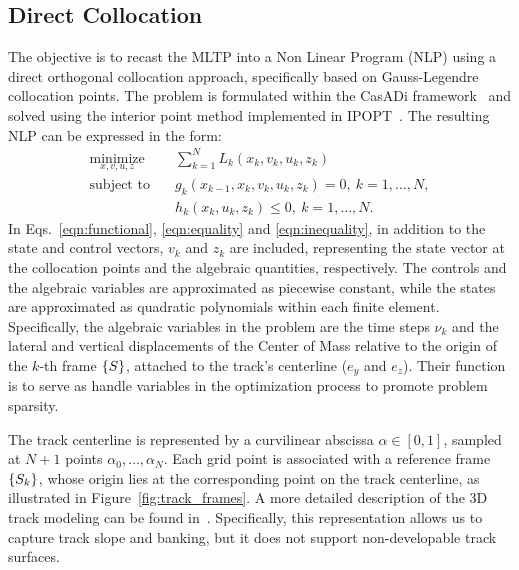 \subsection{Direct Collocation}
The objective is to recast the MLTP into a Non Linear Program (NLP) using a direct orthogonal collocation approach, specifically based on Gauss-Legendre collocation points. The problem is formulated within the CasADi framework~\cite{Andersson:MPC:2019} and solved using the interior point method implemented in IPOPT~\cite{Wachter:MP:2006}. The resulting NLP can be expressed in the form:
\begin{align}
	\underset{x,v,u,z}{\textrm{minimize}}&\quad\sum_{k=1}^NL_k(x_k,v_k,u_k,z_k)\label{eqn:functional}\\
	\textrm{subject to}&\quad g_k(x_{k-1},x_k,v_k,u_k,z_k)=0,\ k=1,\ldots,N,\label{eqn:equality}\\
	&\quad h_k(x_k,u_k,z_k)\le0,\ k=1,\ldots,N.\label{eqn:inequality}
\end{align}
In Eqs.~\eqref{eqn:functional}, \eqref{eqn:equality} and \eqref{eqn:inequality}, in addition to the state and control vectors, $v_k$ and $z_k$ are included, representing the state vector at the collocation points and the algebraic quantities, respectively. The controls and the algebraic variables are approximated as piecewise constant, while the states are approximated as quadratic polynomials within each finite element. Specifically, the algebraic variables in the problem are the time steps $\nu_k$ and the lateral and vertical displacements of the Center of Mass relative to the origin of the $k$-th frame $\left\{S\right\}$, attached to the track's centerline ($e_y$ and $e_z$). Their function is to serve as handle variables in the optimization process to promote problem sparsity.

The track centerline is represented by a curvilinear abscissa $\alpha\in[0,1]$, sampled at $N+1$ points $\alpha_0,\ldots,\alpha_N$. Each grid point is associated with a reference frame $\left\{S_k\right\}$, whose origin lies at the corresponding point on the track centerline, as illustrated in Figure~\ref{fig:track_frames}. A more detailed description of the 3D track modeling can be found in~\cite{Bartali:Meccanica:2023}. Specifically, this representation allows us to capture track slope and banking, but it does not support non-developable track surfaces.

